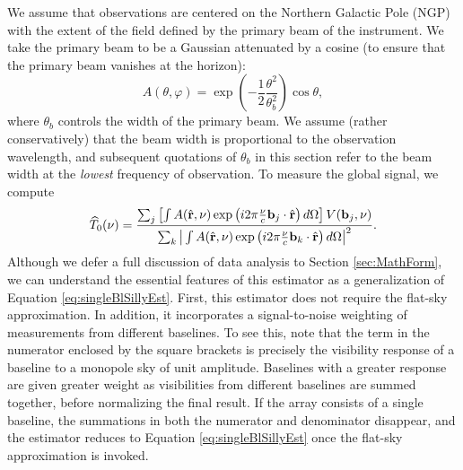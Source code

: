 \documentclass[twocolumn,apj,numberedappendix]{emulateapj}
\newcommand{\rhat}{\hat{\mathbf{r}}}
\begin{document}
We assume that observations are centered on the Northern Galactic Pole (NGP) with the extent of the field defined by the primary beam of the instrument. We take the primary beam to be a Gaussian attenuated by a cosine (to ensure that the primary beam vanishes at the horizon):
\begin{equation}
\label{eq:TaperedGauss}
A(\theta, \varphi) = \exp \left( -\frac{1}{2} \frac{\theta^2}{\theta_b^2} \right) \cos \theta,
\end{equation}
where $\theta_b$ controls the width of the primary beam. We assume (rather conservatively) that the beam width is proportional to the observation wavelength, and subsequent quotations of $\theta_b$ in this section refer to the beam width at the \emph{lowest} frequency of observation. To measure the global signal, we compute
\begin{equation}
\label{eq:NormedSimpleEst}
\widehat{T}_0 (\nu) = \frac{ \sum_j \left[ \int  A(\rhat, \nu) \exp\left(i 2\pi \frac{\nu }{c}\mathbf{b}_j \cdot \rhat \right)d\Omega \right] V(\mathbf{b}_j, \nu)}{ \sum_k \big{|} \int  A(\rhat, \nu) \exp\left(i 2\pi \frac{\nu }{c}\mathbf{b}_k \cdot \rhat \right)d\Omega \big{|}^2}.
\end{equation}
Although we defer a full discussion of data analysis to Section \ref{sec:MathForm}, we can understand the essential features of this estimator as a generalization of Equation \eqref{eq:singleBlSillyEst}. First, this estimator does not require the flat-sky approximation. In addition, it incorporates a signal-to-noise weighting of measurements from different baselines. To see this, note that the term in the numerator enclosed by the square brackets is precisely the visibility response of a baseline to a monopole sky of unit amplitude. Baselines with a greater response are given greater weight as visibilities from different baselines are summed together, before normalizing the final result. If the array consists of a single baseline, the summations in both the numerator and denominator disappear, and the estimator reduces to Equation \eqref{eq:singleBlSillyEst} once the flat-sky approximation is invoked.
\end{document}
